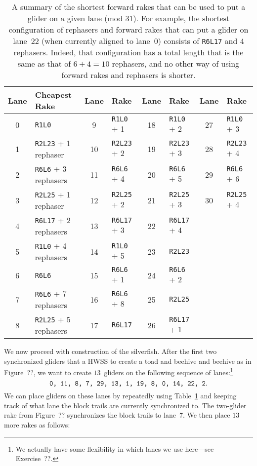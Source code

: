 \begin{table}[!htbp]
	\centering
	\begin{tabular}{c l | c l | c l | c l}
		\toprule
		Lane & Cheapest Rake & Lane & Rake & Lane & Rake & Lane & Rake \\ \midrule
		0 & \texttt{R1L0} & 9 & \texttt{R1L0} + 1 & 18 & \texttt{R1L0} + 2 & 27 & \texttt{R1L0} + 3 \\
		1 & \texttt{R2L23} + 1 rephaser & 10 & \texttt{R2L23} + 2 & 19 & \texttt{R2L23} + 3 & 28 & \texttt{R2L23} + 4\\
		2 & \texttt{R6L6} + 3 rephasers & 11 & \texttt{R6L6} + 4 & 20 & \texttt{R6L6} + 5 & 29 & \texttt{R6L6} + 6 \\
		3 & \texttt{R2L25} + 1 rephaser & 12 & \texttt{R2L25} + 2 & 21 & \texttt{R2L25} + 3 & 30 & \texttt{R2L25} + 4 \\
		4 & \texttt{R6L17} + 2 rephasers & 13 & \texttt{R6L17} + 3 & 22 & \texttt{R6L17} + 4 & & \\
		5 & \texttt{R1L0} + 4 rephasers & 14 & \texttt{R1L0} + 5 & 23 & \texttt{R2L23} & & \\
		6 & \texttt{R6L6} & 15 & \texttt{R6L6} + 1 & 24 & \texttt{R6L6} + 2 & & \\
		7 & \texttt{R6L6} + 7 rephasers & 16 & \texttt{R6L6} + 8 & 25 & \texttt{R2L25} & & \\
		8 & \texttt{R2L25} + 5 rephasers & 17 & \texttt{R6L17} & 26 & \texttt{R6L17} + 1 & & \\
		\bottomrule
	\end{tabular}
	\caption{A summary of the shortest forward rakes that can be used to put a glider on a given lane (mod $31$). For example, the shortest configuration of rephasers and forward rakes that can put a glider on lane~22 (when currently aligned to lane~0) consists of \texttt{R6L17} and 4 rephasers. Indeed, that configuration has a total length that is the same as that of $6 + 4 = 10$ rephasers, and no other way of using forward rakes and rephasers is shorter.}\label{tab:silverfish_forward_rakes}
\end{table}

We now proceed with construction of the silverfish. After the first two synchronized gliders that a HWSS to create a toad and beehive and beehive as in Figure~??, we want to create $13$~gliders on the following sequence of lanes:\footnote{We actually have some flexibility in which lanes we use here---see Exercise~??.}%
\[
	\text{\texttt{0, 11, 8, 7, 29, 13, 1, 19, 8, 0, 14, 22, 2}.}
\]
We can place gliders on these lanes by repeatedly using Table~\ref{tab:silverfish_forward_rakes} and keeping track of what lane the block trails are currently synchronized to. The two-glider rake from Figure~?? synchronizes the block trails to lane~7. We then place $13$ more rakes as follows:\smallskip

